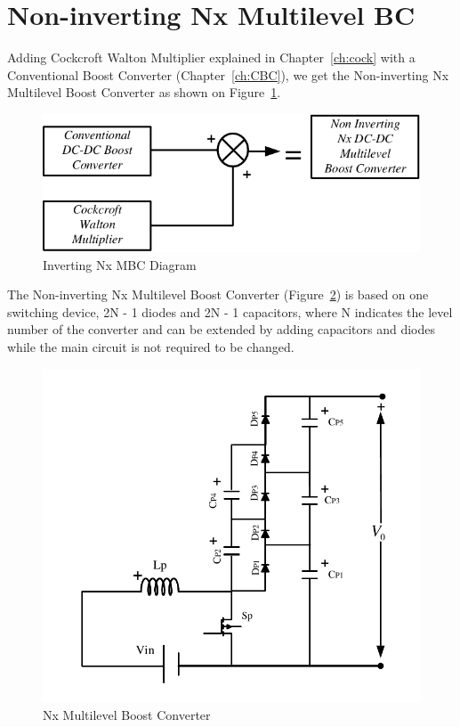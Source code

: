 \section{Non-inverting Nx Multilevel BC}\label{ch:MBC}


Adding Cockcroft Walton Multiplier explained in Chapter~\ref{ch:cock} with a Conventional Boost Converter (Chapter~\ref{ch:CBC}), we get the Non-inverting Nx Multilevel Boost Converter as shown on Figure~\ref{fig:MBC_CW_CBCtoNx}. \cite{Bhaskar2016}

\begin{figure}[H]
   \centering
   \includegraphics[width=\textwidth]{figures/yMultilevel/CW_CBCtoNx.pdf}
   \caption{Inverting Nx MBC Diagram}
	\label{fig:MBC_CW_CBCtoNx}
\end{figure}


The Non-inverting Nx Multilevel Boost Converter (Figure~\ref{fig:MBC_3XFULL}) is based on one switching device, 2N - 1 diodes and 2N - 1 capacitors, where N indicates the level number of the converter and can be extended by adding capacitors and diodes while the main circuit is not required to be changed. \cite{Rosas-Caro2008}

\begin{figure}[H]
   \centering
   \includegraphics[width=\textwidth]{figures/yMultilevel/3x_FULL.pdf}
    \caption{Nx Multilevel Boost Converter}
	\label{fig:MBC_3XFULL}
\end{figure}

